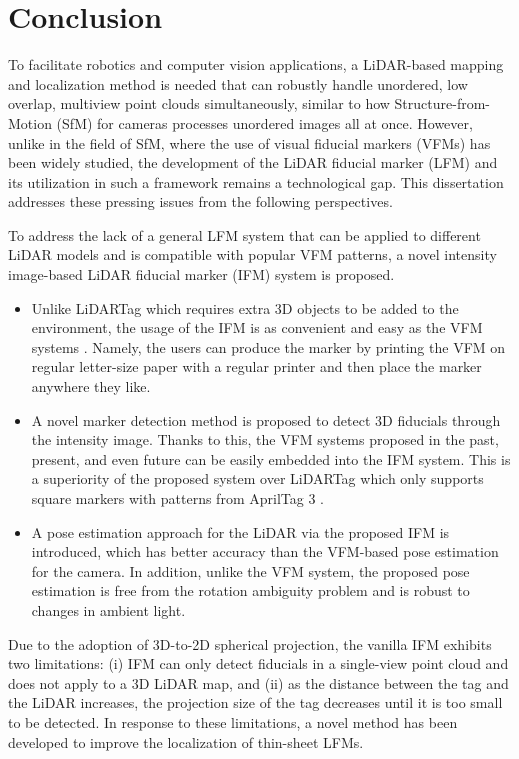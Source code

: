 \section{Conclusion}
To facilitate robotics and computer vision applications, a LiDAR-based mapping and localization method is needed that can robustly handle unordered, low overlap, multiview point clouds simultaneously, similar to how Structure-from-Motion (SfM) for cameras processes unordered images all at once.
However, unlike in the field of SfM, where the use of visual fiducial markers (VFMs) has been widely studied, the development of the LiDAR fiducial marker (LFM) and its utilization in such a framework remains a technological gap. This dissertation addresses these pressing issues from the following perspectives.
\par
To address the lack of a general LFM system that can be applied to different LiDAR models and is compatible with popular VFM patterns, a novel intensity image-based LiDAR fiducial marker (IFM) system is proposed. 
\begin{itemize}
\item Unlike LiDARTag \cite{lt} which requires extra 3D objects to be added to the environment, the usage of the IFM is as convenient and easy as the VFM systems \cite{ap3,aruco}. Namely, the users can produce the marker by printing the VFM on regular letter-size paper with a regular printer and then place the marker anywhere they like. 
\item A novel marker detection method is proposed to detect 3D fiducials through the intensity image. Thanks to this, the VFM systems proposed in the past, present, and even future can be easily embedded into the IFM system. This is a superiority of the proposed system over LiDARTag \cite{lt} which only supports square markers with patterns from AprilTag 3 \cite{ap3}. 
\item A pose estimation approach for the LiDAR via the proposed IFM is introduced, which has better accuracy than the VFM-based pose estimation for the camera. In addition, unlike the VFM system, the proposed pose estimation is free from the rotation ambiguity problem \cite{ippe,yibo} and is robust to changes in ambient light. 
\end{itemize} \par
Due to the adoption of 3D-to-2D spherical projection, the vanilla IFM exhibits two limitations: (i) IFM can only detect fiducials in a single-view point cloud and does not apply to a 3D LiDAR map, and (ii) as the distance between the tag and the LiDAR increases, the projection size of the tag decreases until it is too small to be detected. In response to these limitations, a novel method has been developed to improve the localization of thin-sheet LFMs.
